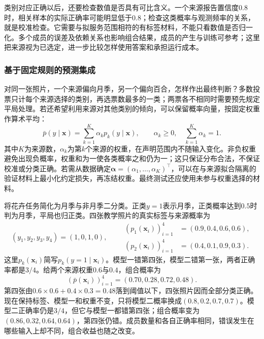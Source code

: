 类别对应正确以后，还要检查数值是否具有可比含义。一个来源报告置信度$0.8$时，相关样本的实际正确率可能明显低于$0.8$；检查这类概率与观测频率的关系，就是校准检查。它需要与拟服务范围相符的有标签材料，不能只看数值是否归一化。多个成员的误差及依赖关系也影响组合结果，成员的产生与训练可参考；这里把来源视为已选定，进一步比较怎样使用答案和承担运行成本。

\subsubsection{基于固定规则的预测集成}
\label{sec:ket-integration-fixed-prediction}

对同一张照片，一个来源偏向月季，另一个偏向百合，怎样作出最终判断？多数投票只计每个来源选择的类别，再选票数最多的一类；两票各不相同时需要预先规定平局处理。若还希望利用来源对其他类别的倾向，可以保留概率向量，按固定权重作算术平均：
\begin{equation}
  \bar p(y\mid\bm{x})=\sum_{k=1}^{K}\alpha_k p_k(y\mid\bm{x}),
  \qquad \alpha_k\geq 0,\quad \sum_{k=1}^{K}\alpha_k=1.
  \label{eq:ket-integration-fixed-average}
\end{equation}
其中$K$为来源数，$\alpha_k$为第$k$个来源的权重，在声明范围内不随输入变化。非负权重避免出现负概率，权重和为一使各类概率之和仍为一；这只保证分布合法，不保证校准或分类正确。若需从数据确定$\bm{\alpha}=(\alpha_1,\ldots,\alpha_K)^\top$，可以在与来源拟合隔离的验证材料上最小化约定损失，再冻结权重。最终测试还应使用未参与权重选择的材料。

\begin{example}[互补错误与共同错误]
  \label{ex:ket-integration-weighted-prediction}
  将花卉任务简化为月季与非月季二分类。正类$y=1$表示月季，正类概率达到$0.5$时判为月季，平局也归正类。四张教学照片的真实标签与来源概率为
  \[
    (y_1,y_2,y_3,y_4)=(1,0,1,0),\qquad
    \begin{aligned}
      (p_1(\bm{x}_i))_{i=1}^{4}&=(0.9,0.4,0.6,0.6),\\
      (p_2(\bm{x}_i))_{i=1}^{4}&=(0.4,0.1,0.9,0.3).
    \end{aligned}
  \]
  这里$p_k(\bm{x}_i)$简写$p_k(y=1\mid\bm{x}_i)$。模型一错第四张，模型二错第一张，两者正确率都是$3/4$。给两个来源权重$0.6$与$0.4$，组合概率为
  \[
    (\bar p(\bm{x}_i))_{i=1}^{4}
    =(0.70,0.28,0.72,0.48).
  \]
  第四张由$0.6\times0.6+0.4\times0.3=0.48$落到阈值以下，四张照片因而全部分类正确。现在保持标签、模型一和权重不变，只将模型二概率换成$(0.8,0.2,0.7,0.7)$。模型二正确率仍是$3/4$，但它与模型一都错第四张；组合概率变为$(0.86,0.32,0.64,0.64)$，第四张仍错。成员数量和各自正确率相同，错误发生在哪些输入上却不同，组合收益也随之改变。
\end{example}

